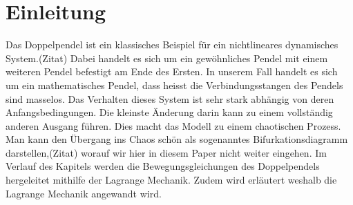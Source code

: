 
\section{Einleitung}
Das Doppelpendel ist ein klassisches Beispiel für ein nichtlineares dynamisches System.(Zitat)
Dabei handelt es sich um ein gewöhnliches Pendel mit einem weiteren Pendel
befestigt am Ende des Ersten.
In unserem Fall handelt es sich um ein mathematisches Pendel, dass heisst
die Verbindungsstangen des Pendels sind masselos.
Das Verhalten dieses System ist sehr stark abhängig von deren Anfangsbedingungen.
Die kleinste Änderung darin kann zu einem vollständig anderen Ausgang führen.
Dies macht das Modell zu einem chaotischen Prozess.
Man kann den Übergang ins Chaos schön als sogenanntes Bifurkationsdiagramm darstellen,(Zitat)
worauf wir hier in diesem Paper nicht weiter eingehen.
Im Verlauf des Kapitels werden die Bewegungsgleichungen des Doppelpendels
hergeleitet mithilfe der Lagrange Mechanik.
Zudem wird erläutert weshalb die Lagrange Mechanik angewandt wird.